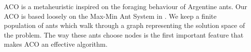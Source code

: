 ACO is a metaheuristic inspired on the foraging behaviour of Argentine ants. Our ACO is based loosely on the Max-Min Ant System in \cite{stutzle2000max}. We keep a finite population of ants which walk through a graph representing the solution space of the problem. The way these ants choose nodes is the first important feature that makes ACO an effective algorithm.  

